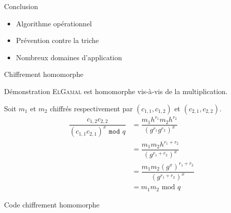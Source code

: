 \documentclass[10pt, compress]{beamer}
\begin{document}
  \begin{frame}{Conclusion}
    \begin{itemize}
      \item \alert{Algorithme} opérationnel
      \item Prévention contre la \alert{triche}
      \item Nombreux domaines d'\alert{application}
    \end{itemize}
  \end{frame}

\appendix
{}

  \begin{frame}{Chiffrement homomorphe}
    \begin{exampleblock}{Démonstration}
      \textsc{ElGamal} est homomorphe vis-à-vis de la multiplication.
    \end{exampleblock}
    Soit $m_1$ et $m_2$ chiffrés respectivement par $(c_{1, 1}, c_{1, 2})$ et $(c_{2, 1}, c_{2, 2})$.
    \begin{align*}
      \dfrac{c_{1, 2} c_{2, 2}}{(c_{1, 1} c_{2, 1})^x\texttt{ mod }q}
      &= \dfrac{m_1 h^{r_1} m_2  h^{r_2}}{(g^{r_1} g^{r_2})^x} \\
      &= \dfrac{m_1m_2 h^{r_1+r_2}}{(g^{r_1+r_2})^x} \\
      &= \dfrac{m_1m_2(g^x)^{r_1+r_2}}{(g^{r_1+r_2})^x} \\
      &= m_1m_2\text{ mod }q
    \end{align*}
  \end{frame}

  \begin{frame}{Code chiffrement homomorphe}
    \inputminted[linenos, breaklines, autogobble, fontsize=\small, firstline=1, lastline=16]{python}{../elgamal.py}
  \end{frame}

  \begin{frame}
    \inputminted[linenos, breaklines, autogobble, fontsize=\small, firstline=17, lastline=35]{python}{../elgamal.py}
  \end{frame}

  \begin{frame}
    \inputminted[linenos, breaklines, autogobble, fontsize=\small, firstline=36, lastline=55]{python}{../elgamal.py}
  \end{frame}

  \begin{frame}
    \inputminted[linenos, breaklines, autogobble, fontsize=\small, firstline=56, lastline=75]{python}{../elgamal.py}
  \end{frame}
\end{document}
